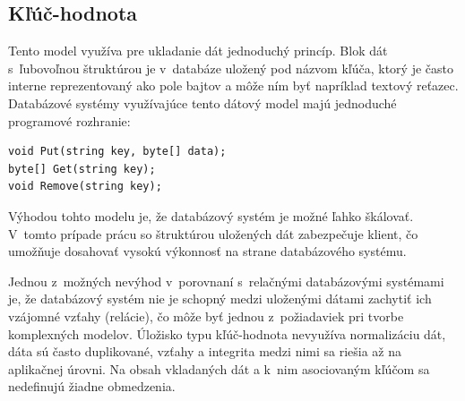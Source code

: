 \documentclass[11pt,twoside,a4paper]{book}
\begin{document}
% 
% 
% 
% 
% 
% 
% 
% 

\subsection{Kľúč-hodnota}


Tento model využíva pre ukladanie dát jednoduchý princíp. Blok dát s~ľubovoľnou štruktúrou je v~databáze uložený pod názvom kľúča, ktorý je často interne reprezentovaný ako pole bajtov a môže ním byť napríklad textový reťazec. Databázové systémy využívajúce tento dátový model majú jednoduché programové rozhranie:

\begin{verbatim}
void Put(string key, byte[] data);
byte[] Get(string key);
void Remove(string key);
\end{verbatim}


Výhodou tohto modelu je, že databázový systém je možné ľahko škálovať. V~tomto prípade prácu so štruktúrou uložených dát zabezpečuje klient, čo umožňuje dosahovať vysokú výkonnosť na strane databázového systému.

Jednou z~možných nevýhod v~porovnaní s~relačnými databázovými systémami je, že databázový systém nie je schopný medzi uloženými dátami zachytiť ich vzájomné vzťahy (relácie), čo môže byť jednou z~požiadaviek pri tvorbe komplexných modelov. Úložisko typu kľúč-hodnota nevyužíva normalizáciu dát, dáta sú často duplikované, vzťahy a integrita medzi nimi sa riešia až na aplikačnej úrovni. Na obsah vkladaných dát a k~nim asociovaným kľúčom sa nedefinujú žiadne obmedzenia.
\end{document}
